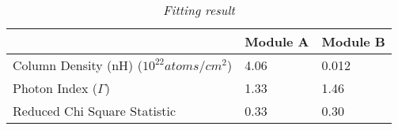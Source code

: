 \documentclass[12pt]{report}
\newcommand{\mycaption}[1]{\caption{\textit{\footnotesize #1}}}
\begin{document}
        \begin{table}[!h] 
          \centering
          \begin{tabular}{| m{4cm} | m{3cm} | m{3cm} |}
            \hline
            & Module A & Module B \\
            \hline
            Column Density (nH) ($10^{22} atoms/cm^2$) & 4.06 & 0.012\\ 
            \hline
            Photon Index ($\Gamma$) & 1.33 & 1.46 \\
            \hline 
            Reduced Chi Square Statistic & 0.33 & 0.30 \\
            \hline 
          \end{tabular}
          \mycaption{Fitting result  }
          \label{table:parameter_1}
        \end{table}
\end{document}
